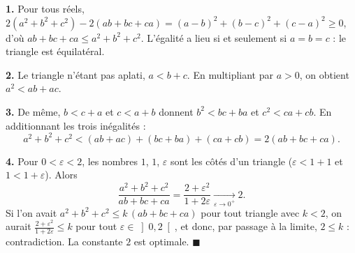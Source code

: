 \textbf{1.} Pour tous réels,
$2(a^2 + b^2 + c^2) - 2(ab + bc + ca) = (a-b)^2 + (b-c)^2 + (c-a)^2 \geqslant 0$,
d'où $ab + bc + ca \leqslant a^2 + b^2 + c^2$. L'égalité a lieu si et
seulement si $a = b = c$ : le triangle est équilatéral.

\textbf{2.} Le triangle n'étant pas aplati, $a < b + c$. En multipliant par
$a > 0$, on obtient $a^2 < ab + ac$.

\textbf{3.} De même, $b < c + a$ et $c < a + b$ donnent $b^2 < bc + ba$ et
$c^2 < ca + cb$. En additionnant les trois inégalités :
\[
a^2 + b^2 + c^2 < (ab + ac) + (bc + ba) + (ca + cb) = 2(ab + bc + ca).
\]

\textbf{4.} Pour $0 < \varepsilon < 2$, les nombres $1$, $1$, $\varepsilon$
sont les côtés d'un triangle ($\varepsilon < 1 + 1$ et $1 < 1 + \varepsilon$). Alors
\[
\frac{a^2 + b^2 + c^2}{ab + bc + ca} = \frac{2 + \varepsilon^2}{1 + 2\varepsilon}
\xrightarrow[\varepsilon \to 0^+]{} 2 .
\]
Si l'on avait $a^2 + b^2 + c^2 \leqslant k\,(ab + bc + ca)$ pour tout triangle
avec $k < 2$, on aurait $\frac{2 + \varepsilon^2}{1 + 2\varepsilon} \leqslant k$
pour tout $\varepsilon \in \left]0, 2\right[$, et donc, par passage à la
limite, $2 \leqslant k$ : contradiction. La constante $2$ est optimale.
\hfill $\blacksquare$
